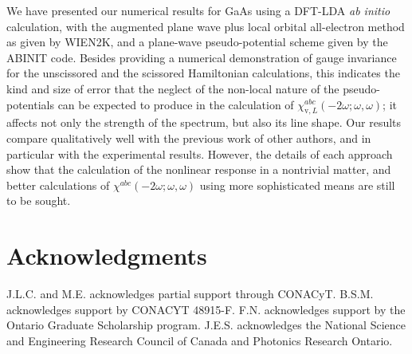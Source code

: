 \documentclass[floatfix,prb,aps,superscriptaddress,11pt]{revtex4}
\begin{document}
We have presented our numerical results for GaAs using a DFT-LDA {\it ab initio}
calculation, with the augmented plane wave plus local orbital all-electron
method as given by WIEN2K,\cite{wien2k} and a plane-wave pseudo-potential
scheme given by the ABINIT code.\cite{gonzeCMS02} 
Besides providing a numerical demonstration of gauge invariance for the 
unscissored and the scissored Hamiltonian calculations, this indicates the kind 
and size of error
that the neglect of the non-local nature of the pseudo-potentials can
be expected to produce in the calculation of 
$\chi_{\mathrm{v},L}^{abc}(-2\omega;\omega,\omega)$;
 it affects  not only the strength of the spectrum, but also
its line shape. Our results compare qualitatively well with the previous
work of other authors, and in particular with the experimental results.
However, the details of each approach show that the calculation of the
nonlinear response in a nontrivial matter, and better calculations of 
$\chi^{abc}(-2\omega;\omega,\omega)$ using more sophisticated means are still to be
sought. 

\section{Acknowledgments}

J.L.C. and M.E. acknowledges partial support through CONACyT. B.S.M. acknowledges
support by CONACYT 48915-F. F.N. acknowledges support by the Ontario
Graduate Scholarship program. J.E.S. acknowledges the National Science and
Engineering Research Council of Canada and Photonics Research Ontario.

\appendix

\section{}
\end{document}
